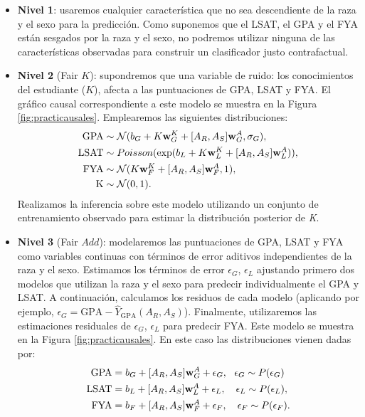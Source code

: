\documentclass[oneside,openright,titlepage,numbers=noenddot,openany,headinclude,footinclude=true,
cleardoublepage=empty,abstractoff,BCOR=5mm,paper=a4,fontsize=12pt,main=spanish]{scrreprt}
\begin{document}
\begin{itemize}
    \item \textbf{Nivel 1}: usaremos cualquier característica que no sea descendiente de la raza y el sexo para la predicción. Como suponemos que el LSAT, el GPA y el FYA están sesgados por la raza y el sexo, no podremos utilizar ninguna de las características observadas para construir un clasificador justo contrafactual.
    
    \item \textbf{Nivel 2} (Fair $K$): supondremos que una variable de ruido: los conocimientos del estudiante ($K$), afecta a las puntuaciones de GPA, LSAT y FYA. El gráfico causal correspondiente a este modelo se muestra en la Figura \ref{fig:practicausales}. Emplearemos las siguientes distribuciones:
    \begin{equation*}
    \begin{split}
        \text{GPA} &\sim \mathcal{N}(b_G+K \textbf{w}^K_G+[A_R,A_S] \textbf{w}^A_G, \sigma_G),\\
        \text{LSAT} &\sim Poisson(\text{exp}(b_L+K \textbf{w}^K_L +[A_R,A_S] \textbf{w}^A_L)),\\ 
        \text{FYA}&\sim \mathcal{N}(K \textbf{w}^K_F+[A_R,A_S] \textbf{w}^A_F, 1),\\
        \text{K}&\sim \mathcal{N}(0,1).
    \end{split}
    \end{equation*}
    Realizamos la inferencia sobre este modelo utilizando un conjunto de entrenamiento observado para estimar la distribución posterior de \textit{K}.
    
    \item \textbf{Nivel 3} (Fair $Add$): modelaremos las puntuaciones de GPA, LSAT y FYA como variables continuas con términos de error aditivos independientes de la raza y el sexo. Estimamos los términos de error $\epsilon_G$, $\epsilon_L$ ajustando primero dos modelos que utilizan la raza y el sexo para predecir individualmente el GPA y LSAT. A continuación, calculamos los residuos de cada modelo (aplicando por ejemplo, $\epsilon_G =\text{GPA}-\hat{Y}_{\text{GPA}}(A_R, A_S)$). Finalmente, utilizaremos las estimaciones residuales de $\epsilon_G$, $\epsilon_L$ para predecir FYA. Este modelo se muestra en la Figura \ref{fig:practicausales}. En este caso las distribuciones vienen dadas por:
    \begin{equation*}
    \begin{split}
        \text{GPA} &= b_G+[A_R,A_S] \nm{w}^A_G +\epsilon_G, \ \ \epsilon_G \sim P(\epsilon_G)\\
        \text{LSAT} &= b_L+[A_R,A_S] \nm{w}^A_L +\epsilon_L, \quad \epsilon_L \sim P(\epsilon_L),\\
        \text{FYA}&= b_F+[A_R,A_S] \nm{w}^A_F +\epsilon_F, \quad \epsilon_F \sim P(\epsilon_F).
    \end{split}
    \end{equation*}
\end{itemize}\
\end{document}
